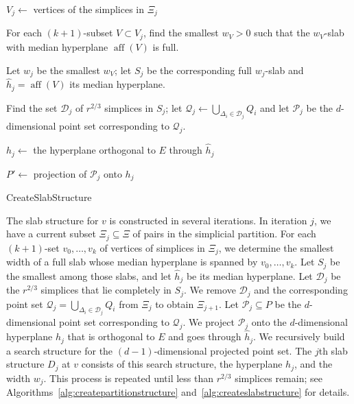 \documentclass[a4paper,11pt]{paper}
\DeclareMathOperator{\aff}{aff}
\newenvironment{alg}{\begin{algorithm}[htbp]}{\end{algorithm}}
\begin{document}
\begin{alg}
  \DontPrintSemicolon

  $V_j \gets$ vertices of the simplices in $\Xi_j$

  For each $(k+1)$-subset $V \subset V_j$, find the
  smallest $w_V > 0$ such that the $w_V$-slab with median
  hyperplane $\aff(V)$ is full.

  Let $w_j$ be the smallest $w_V$; let $S_j$ be the
  corresponding full $w_j$-slab and $\widehat{h}_j = \aff(V)$ its median
  hyperplane.

  Find the set $\mathcal{D}_{j}$ of $r^{2/3}$ simplices
  in $S_j$; let
  $\mathcal{Q}_{j} \gets \bigcup_{\Delta_i \in \mathcal{D}_{j}} Q_i$
  and let $\mathcal{P}_{j}$ be the $d$-dimensional point set
  corresponding to $\mathcal{Q}_{j}$.

  $h_j \gets$ the hyperplane orthogonal to $E$ through $\widehat{h}_j$

  $P' \gets $ projection of $\mathcal{P}_j$ onto $h_j$

  \caption{CreateSlabStructure}
  \label{alg:createslabstructure}
\end{alg}

The slab structure for $v$ is constructed in several iterations.
In iteration $j$, we have a current subset $\Xi_j \subseteq \Xi$
of pairs in the simplicial partition.
For each $(k+1)$-set $v_0, \dots, v_k$ of vertices
of simplices in $\Xi_j$, we determine the smallest
width of a full slab whose median hyperplane is
spanned by $v_0,\dots,v_k$. Let $S_j$ be the smallest among those slabs,
and let $\widehat{h}_j$ be its median hyperplane.
Let $\mathcal{D}_j$ be the $r^{2/3}$ simplices that lie completely
in $S_j$.  We remove $\mathcal{D}_{j}$ and the corresponding point
set $\mathcal{Q}_{j}=\bigcup_{\Delta_i \in \mathcal{D}_{j}} Q_i$
from $\Xi_j$ to obtain $\Xi_{j+1}$. Let
$\mathcal{P}_{j} \subseteq P$ be the
$d$-dimensional point set corresponding to $\mathcal{Q}_{j}$.
We project $\mathcal{P}_{j}$ onto the $d$-dimensional
hyperplane $h_j$ that is orthogonal to $E$ and goes through
$\widehat{h}_j$. We recursively
build a search structure for the $(d-1)$-dimensional projected
point set. The $j$th slab structure $D_j$ at $v$ consists of this
search structure, the hyperplane
$h_j$, and the width $w_j$. This process is repeated until less than
$r^{2/3}$ simplices remain; see
Algorithms~\ref{alg:createpartitionstructure}
and~\ref{alg:createslabstructure} for details.
\end{document}
